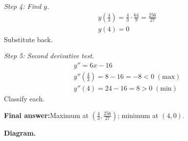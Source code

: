 \documentclass[11pt]{article}
\begin{document}
\textit{Step 4: Find \( y \).}
\[\begin{gathered}
y\!\left(\tfrac{4}{3}\right) = \tfrac{4}{3} \cdot \tfrac{64}{9} = \tfrac{256}{27} \\ y(4) = 0
\end{gathered}\]
Substitute back.

\textit{Step 5: Second derivative test.}
\[\begin{gathered}
y'' = 6x - 16 \\ y''(\tfrac{4}{3}) = 8 - 16 = -8 < 0\; (\text{max}) \\ y''(4) = 24 - 16 = 8 > 0\; (\text{min})
\end{gathered}\]
Classify each.

\begin{answerbox}
\textbf{Final answer:}\quad Maximum at \(\displaystyle  (\tfrac{4}{3}, \tfrac{256}{27}) \); minimum at \(\displaystyle  (4, 0) \).
\end{answerbox}
\textbf{Diagram.}
\end{document}
